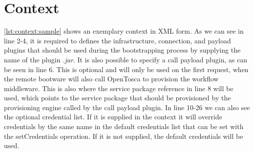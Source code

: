 \section{Context}
\label{implementation:context}

\vspace*{\baselineskip}

\autoref{lst:context:sample} shows an exemplary context in XML form.
As we can see in line 2-4, it is required to defines the infrastructure, connection, and payload plugins that should be used during the bootstrapping process by supplying the name of the plugin \textit{.jar}.
It is also possible to specify a call payload plugin, as can be seen in line 6.
This is optional and will only be used on the first request, when the remote bootware will also call OpenTosca to provision the workflow middleware.
This is also where the service package reference in line 8 will be used, which points to the service package that should be provisioned by the provisioning engine called by the call payload plugin.
In line 10-26 we can also see the optional credential list.
If it is supplied in the context it will override credentials by the same name in the default credentials list that can be set with the setCredentials operation.
If it is not supplied, the default credentials will be used.
